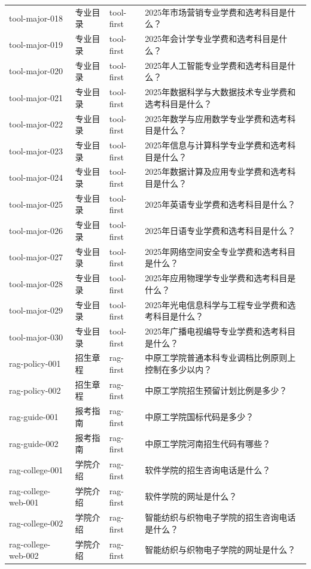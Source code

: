 \documentclass[UTF8,zihao=-4,oneside]{ctexbook}
\numberwithin{equation}{chapter}
\begin{document}
{\begin{longtable}{p{}p{}p{}p{}}
  tool-major-018 & 专业目录 & tool-first & 2025年市场营销专业学费和选考科目是什么？ \\
  tool-major-019 & 专业目录 & tool-first & 2025年会计学专业学费和选考科目是什么？ \\
  tool-major-020 & 专业目录 & tool-first & 2025年人工智能专业学费和选考科目是什么？ \\
  tool-major-021 & 专业目录 & tool-first & 2025年数据科学与大数据技术专业学费和选考科目是什么？ \\
  tool-major-022 & 专业目录 & tool-first & 2025年数学与应用数学专业学费和选考科目是什么？ \\
  tool-major-023 & 专业目录 & tool-first & 2025年信息与计算科学专业学费和选考科目是什么？ \\
  tool-major-024 & 专业目录 & tool-first & 2025年数据计算及应用专业学费和选考科目是什么？ \\
  tool-major-025 & 专业目录 & tool-first & 2025年英语专业学费和选考科目是什么？ \\
  tool-major-026 & 专业目录 & tool-first & 2025年日语专业学费和选考科目是什么？ \\
  tool-major-027 & 专业目录 & tool-first & 2025年网络空间安全专业学费和选考科目是什么？ \\
  tool-major-028 & 专业目录 & tool-first & 2025年应用物理学专业学费和选考科目是什么？ \\
  tool-major-029 & 专业目录 & tool-first & 2025年光电信息科学与工程专业学费和选考科目是什么？ \\
  tool-major-030 & 专业目录 & tool-first & 2025年广播电视编导专业学费和选考科目是什么？ \\
  rag-policy-001 & 招生章程 & rag-first & 中原工学院普通本科专业调档比例原则上控制在多少以内？ \\
  rag-policy-002 & 招生章程 & rag-first & 中原工学院招生预留计划比例是多少？ \\
  rag-guide-001 & 报考指南 & rag-first & 中原工学院国标代码是多少？ \\
  rag-guide-002 & 报考指南 & rag-first & 中原工学院河南招生代码有哪些？ \\
  rag-college-001 & 学院介绍 & rag-first & 软件学院的招生咨询电话是什么？ \\
  rag-college-web-001 & 学院介绍 & rag-first & 软件学院的网址是什么？ \\
  rag-college-002 & 学院介绍 & rag-first & 智能纺织与织物电子学院的招生咨询电话是什么？ \\
  rag-college-web-002 & 学院介绍 & rag-first & 智能纺织与织物电子学院的网址是什么？ \\

\end{longtable}}
\end{document}

